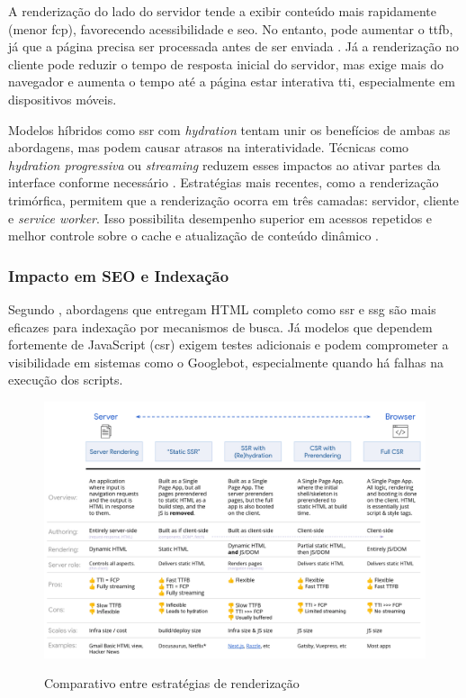 A renderização do lado do servidor tende a exibir conteúdo mais rapidamente (menor \acrshort{fcp}), favorecendo acessibilidade e \acrshort{seo}. No entanto, pode aumentar o \acrshort{ttfb}, já que a página precisa ser processada antes de ser enviada \cite{osmani2025}. Já a renderização no cliente pode reduzir o tempo de resposta inicial do servidor, mas exige mais do navegador e aumenta o tempo até a página estar interativa \acrfull{tti}, especialmente em dispositivos móveis.

Modelos híbridos como \acrshort{ssr} com \textit{hydration} tentam unir os benefícios de ambas as abordagens, mas podem causar atrasos na interatividade. Técnicas como \textit{hydration progressiva} ou \textit{streaming} reduzem esses impactos ao ativar partes da interface conforme necessário \cite{osmani2025}. Estratégias mais recentes, como a renderização trimórfica, permitem que a renderização ocorra em três camadas: servidor, cliente e \textit{service worker}. Isso possibilita desempenho superior em acessos repetidos e melhor controle sobre o cache e atualização de conteúdo dinâmico \cite{osmani2025}.

\subsubsection{Impacto em SEO e Indexação}

Segundo , abordagens que entregam HTML completo como \acrshort{ssr} e \acrshort{ssg} são mais eficazes para indexação por mecanismos de busca. Já modelos que dependem fortemente de JavaScript (\acrshort{csr}) exigem testes adicionais e podem comprometer a visibilidade em sistemas como o Googlebot, especialmente quando há falhas na execução dos scripts.

\begin{figure}[H]
  \centering
  \caption{Comparativo entre estratégias de renderização}
  \includegraphics[width=\textwidth]{media/rendering_comparison_table.png}
  \label{fig:comparativo_renderizacao}
\end{figure}

